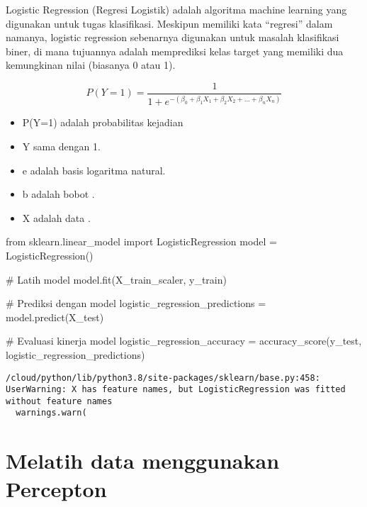 \documentclass[
  letterpaper,
]{krantz}
\makeatletter
\newenvironment{Shaded}{\begin{snugshade}}{\end{snugshade}}
\newcommand{\CommentTok}[1]{\textcolor[rgb]{0.37,0.37,0.37}{#1}}
\newcommand{\ImportTok}[1]{\textcolor[rgb]{0.00,0.46,0.62}{#1}}
\newcommand{\NormalTok}[1]{\textcolor[rgb]{0.00,0.23,0.31}{#1}}
\newcommand{\OperatorTok}[1]{\textcolor[rgb]{0.37,0.37,0.37}{#1}}
\providecommand{\tightlist}{%
  \setlength{\itemsep}{0pt}\setlength{\parskip}{0pt}}\usepackage{longtable,booktabs,array}
\newenvironment{kframe}{%
\medskip{}
\setlength{\fboxsep}{.8em}
 \def\at@end@of@kframe{}%
 \ifinner\ifhmode%
  \def\at@end@of@kframe{\end{minipage}}%
  \begin{minipage}{\columnwidth}%
 \fi\fi%
 \def\FrameCommand##1{\hskip\@totalleftmargin \hskip-\fboxsep
 \colorbox{shadecolor}{##1}\hskip-\fboxsep
     \hskip-\linewidth \hskip-\@totalleftmargin \hskip\columnwidth}%
 \MakeFramed {\advance\hsize-\width
   \@totalleftmargin\z@ \linewidth\hsize
   \@setminipage}}%
 {\par\unskip\endMakeFramed%
 \at@end@of@kframe}
\renewenvironment{Shaded}{\begin{kframe}}{\end{kframe}}
\makeatother
\begin{document}

Logistic Regression (Regresi Logistik) adalah algoritma machine learning
yang digunakan untuk tugas klasifikasi. Meskipun memiliki kata
``regresi'' dalam namanya, logistic regression sebenarnya digunakan
untuk masalah klasifikasi biner, di mana tujuannya adalah memprediksi
kelas target yang memiliki dua kemungkinan nilai (biasanya 0 atau 1).

\[
P(Y=1) = \frac{1}{1 + e^{-(\beta_0 + \beta_1 X_1 + \beta_2 X_2 + \ldots + \beta_n X_n)}}
\]

\begin{itemize}
\tightlist
\item
  P(Y=1) adalah probabilitas kejadian
\item
  Y sama dengan 1.
\item
  e adalah basis logaritma natural.
\item
  b adalah bobot .
\item
  X adalah data .
\end{itemize}

\begin{Shaded}
\begin{Highlighting}[]
\ImportTok{from}\NormalTok{ sklearn.linear\_model }\ImportTok{import}\NormalTok{ LogisticRegression}
\NormalTok{model }\OperatorTok{=}\NormalTok{ LogisticRegression()}

\CommentTok{\# Latih model}
\NormalTok{model.fit(X\_train\_scaler, y\_train)}

\CommentTok{\# Prediksi dengan model}
\NormalTok{logistic\_regression\_predictions }\OperatorTok{=}\NormalTok{ model.predict(X\_test)}

\CommentTok{\# Evaluasi kinerja model}
\NormalTok{logistic\_regression\_accuracy }\OperatorTok{=}\NormalTok{ accuracy\_score(y\_test, logistic\_regression\_predictions)}
\end{Highlighting}
\end{Shaded}

\begin{verbatim}
/cloud/python/lib/python3.8/site-packages/sklearn/base.py:458: UserWarning: X has feature names, but LogisticRegression was fitted without feature names
  warnings.warn(
\end{verbatim}

\hypertarget{melatih-data-menggunakan-percepton}{%
\section*{Melatih data menggunakan
Percepton}\label{melatih-data-menggunakan-percepton}}
\end{document}
